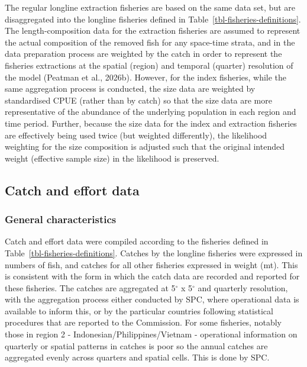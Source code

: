 \documentclass[
  english,
  a4paper,
  a4paper,
  11pt]{SCreport}
\begin{document}
The regular longline extraction fisheries are based on the same data
set, but are disaggregated into the longline fisheries defined in
Table~\ref{tbl-fisheries-definitions}. The length-composition data for
the extraction fisheries are assumed to represent the actual composition
of the removed fish for any space-time strata, and in the data
preparation process are weighted by the catch in order to represent the
fisheries extractions at the spatial (region) and temporal (quarter)
resolution of the model (Peatman et al., 2026b). However, for the index
fisheries, while the same aggregation process is conducted, the size
data are weighted by standardised CPUE (rather than by catch) so that
the size data are more representative of the abundance of the underlying
population in each region and time period. Further, because the size
data for the index and extraction fisheries are effectively being used
twice (but weighted differently), the likelihood weighting for the size
composition is adjusted such that the original intended weight
(effective sample size) in the likelihood is preserved.

\subsection{Catch and effort data}\label{sec-catch-effort-data}

\subsubsection{General characteristics}\label{general-characteristics}

Catch and effort data were compiled according to the fisheries defined
in Table~\ref{tbl-fisheries-definitions}. Catches by the longline
fisheries were expressed in numbers of fish, and catches for all other
fisheries expressed in weight (mt). This is consistent with the form in
which the catch data are recorded and reported for these fisheries. The
catches are aggregated at 5\(^\circ\) x 5\(^\circ\) and quarterly
resolution, with the aggregation process either conducted by SPC, where
operational data is available to inform this, or by the particular
countries following statistical procedures that are reported to the
Commission. For some fisheries, notably those in region 2 -
Indonesian/Philippines/Vietnam - operational information on quarterly or
spatial patterns in catches is poor so the annual catches are aggregated
evenly across quarters and spatial cells. This is done by SPC.
\end{document}
